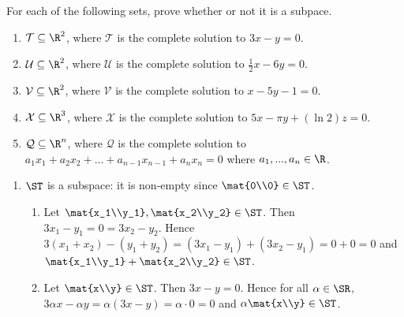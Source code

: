 \begin{exercises}
	\begin{problist}

		\prob For each of the following sets, prove whether or not it is a subpace.
		\begin{enumerate}
			\item  $\mathcal T \subseteq \R^2$, where $\mathcal T$ is the complete solution to $3x-y=0$.
			\item  $\mathcal U \subseteq \R^2$, where $\mathcal U$ is the complete solution to $\frac{1}{2}x-6y=0$.
			\item  $\mathcal V \subseteq \R^2$, where $\mathcal V$ is the complete solution to $x-5y-1=0$.
			\item  $\mathcal X \subseteq \R^3$, where $\mathcal X$ is the complete solution to
			$5x-\pi y + (\ln 2)z=0$.
			\item $\mathcal Q \subseteq \R^n$, where $\mathcal Q$ is the complete solution to
			$a_1x_1+a_2x_2+...+a_{n-1}x_{n-1}+a_nx_n=0$ where $a_1,...,a_n \in \R$.
		\end{enumerate}
		\begin{solution}
			\begin{enumerate}
				\item $\ST$ is a subspace: it is non-empty since $\mat{0\\0}\in\ST$. 
				\begin{enumerate}
					\item Let $\mat{x_1\\y_1},\mat{x_2\\y_2}\in \ST$. Then $3x_1-y_1=0=3x_2-y_2$. Hence $3(x_1+x_2)-(y_1+y_2)=(3x_1-y_1)+(3x_2-y_1)=0+0=0$ and $\mat{x_1\\y_1}+\mat{x_2\\y_2}\in\ST$.
					\item Let $\mat{x\\y}\in\ST$. Then $3x-y=0$. Hence for all $\alpha\in\SR$, $3\alpha x-\alpha y=\alpha(3x-y)=\alpha\cdot 0=0$ and $\alpha\mat{x\\y}\in\ST$.
				\end{enumerate}


\end{enumerate}
\end{solution}
\end{problist}
\end{exercises}
